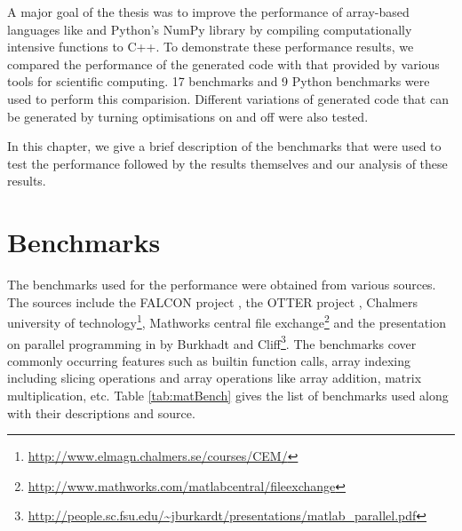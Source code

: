 A major goal of the thesis was to improve the performance of array-based languages like \matlab and Python's NumPy library by compiling computationally intensive functions to C++. To demonstrate these performance results, we compared the performance of the generated code with that provided by various tools for scientific computing. 17 \matlab benchmarks and 9 Python benchmarks were used to perform this comparision. Different variations of generated code that can be generated by turning optimisations on and off were also tested. 

In this chapter, we give a brief description of the benchmarks that were used to test the performance followed by the results themselves and our analysis of these results. 
\section{Benchmarks}
The \matlab benchmarks used for the performance were obtained from various sources. The sources include the FALCON project\cite{DeRose:1999} , the OTTER project \cite{quinn}, Chalmers university of technology\footnote{\url{http://www.elmagn.chalmers.se/courses/CEM/}}, Mathworks central file exchange\footnote{\url{http://www.mathworks.com/matlabcentral/fileexchange}} and the presentation on parallel programming in \matlab by Burkhadt and Cliff\footnote{\url{http://people.sc.fsu.edu/~jburkardt/presentations/matlab_parallel.pdf}}. The benchmarks cover commonly occurring \matlab features such as builtin function calls, array indexing including slicing operations and array operations like array addition, matrix multiplication, etc. Table \ref{tab:matBench} gives the list of benchmarks used along with their descriptions and source.  
